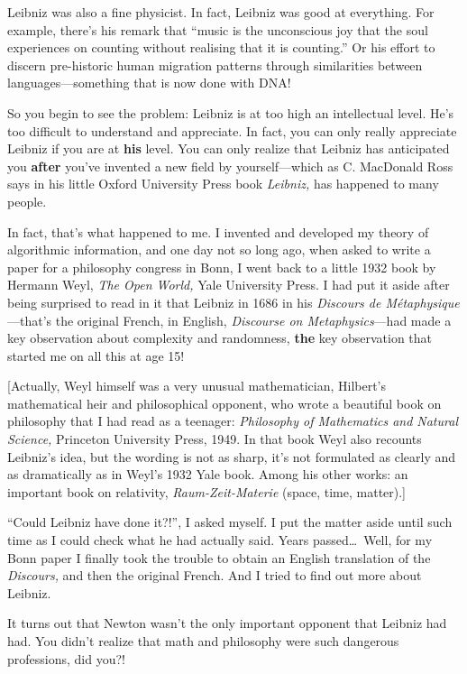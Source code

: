 \documentclass[12pt]{book}
\begin{document}
Leibniz was also a fine physicist. In fact, Leibniz was good at everything.
For example, there's his remark that ``music is the unconscious joy that the
soul experiences on counting without realising that it is counting.''
Or his effort to discern pre-historic human migration patterns through similarities
between languages---something that is now done with DNA!
 
So you begin to see the problem: Leibniz is at too high an intellectual level.
He's too difficult to understand and appreciate.  In fact, you can only 
really appreciate Leibniz if you are at \textbf{his} level.
You can only 
realize that Leibniz has anticipated you
\textbf{after} you've invented a new field by yourself---which as C. MacDonald Ross
says in his little Oxford University Press book \emph{Leibniz,} has happened to
many people.
 
In fact, that's what happened to me. I invented and developed my
theory of algorithmic information, and one day not so long ago, when asked
to write a paper for a philosophy congress in Bonn, I went back to a little
1932 book by Hermann Weyl, \emph{The Open World,} Yale University Press.
I had put it aside after being surprised to read in it that Leibniz in
1686 in his \emph{Discours de M\'etaphysique}---that's the original French,
in English, \emph{Discourse on Metaphysics}---had made a key observation
about complexity and randomness, \textbf{the} key observation that started
me on all this at age 15!
 
{\footnotesize [Actually, Weyl himself was a very unusual mathematician, Hilbert's mathematical heir and
philosophical opponent, who wrote a beautiful book on philosophy that I had
read as a teenager: \emph{Philosophy of Mathematics and Natural Science,}
Princeton University Press, 1949. In that book Weyl also recounts Leibniz's idea,
but the wording is not as sharp, it's not formulated as clearly and as dramatically as in Weyl's
1932 Yale book. Among his other works: an important book on relativity, \emph{Raum-Zeit-Materie}
(space, time, matter).]}
 
``Could Leibniz have done it?!'', I asked myself. I put the matter aside until such time as
I could check what he had actually said. Years passed\ldots\  Well, for my Bonn paper I finally
took the trouble to obtain an English translation of the \emph{Discours,}
and then the original French. 
And I tried to find out more about Leibniz.
 
It turns out that Newton wasn't the only important opponent that Leibniz had had.
You didn't realize that math and philosophy were such dangerous professions, did you?!
 
\end{document}
